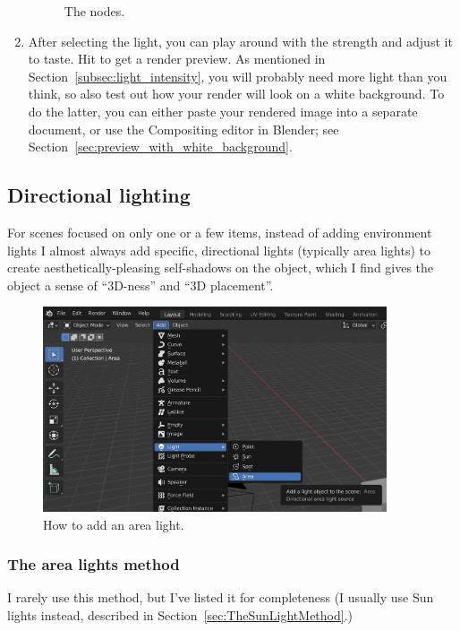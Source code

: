 \documentclass[10pt]{article}
\begin{document}
\begin{enumerate}
\begin{figure}[H]
    \caption{The nodes.}
    \label{fig:world-lighting-nodes}
\end{figure}
\item After selecting the light, you can play around with the strength and adjust it to taste. Hit  to get a render preview. As mentioned in Section~\ref{subsec:light_intensity}, you will probably need more light than you think, so also test out how your render will look on a white background. To do the latter, you can either paste your rendered image into a separate document, or use the Compositing editor in Blender; see Section~\ref{sec:preview_with_white_background}.
\end{enumerate}

\subsection{Directional lighting}
\label{sec:DirectionalLighting}

For scenes focused on only one or a few items, instead of adding environment lights I almost always add specific, directional lights (typically area lights) to create aesthetically-pleasing self-shadows on the object, which I find gives the object a sense of ``3D-ness'' and ``3D placement''. 
\begin{figure}[H]
    \centering
    \captionsetup{width=0.8\textwidth}
    \includegraphics[width=4in]{images/adding-area-light.png}
    \caption{How to add an area light.}
\end{figure}

\subsubsection{The area lights method}
I rarely use this method, but I've listed it for completeness (I usually use Sun lights instead, described in Section~\ref{sec:TheSunLightMethod}.) 
\end{document}
